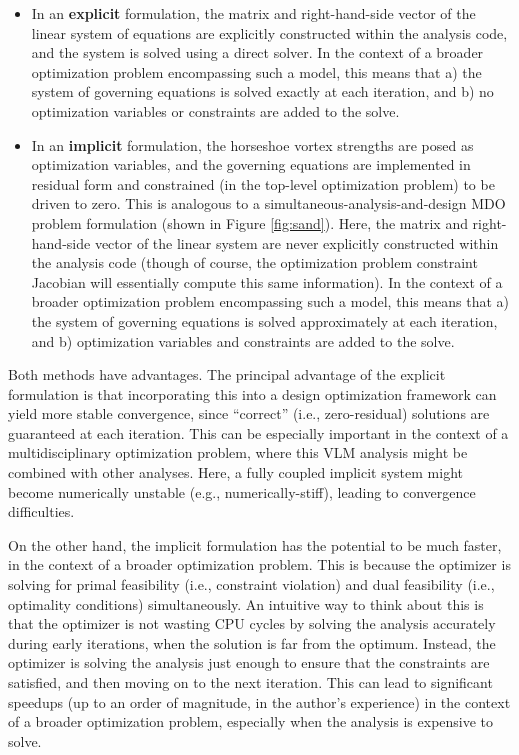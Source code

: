 \begin{itemize}
    \item In an \textbf{explicit} formulation, the matrix and right-hand-side vector of the linear system of equations are explicitly constructed within the analysis code, and the system is solved using a direct solver. In the context of a broader optimization problem encompassing such a model, this means that a) the system of governing equations is solved exactly at each iteration, and b) no optimization variables or constraints are added to the solve.

    \item In an \textbf{implicit} formulation, the horseshoe vortex strengths are posed as optimization variables, and the governing equations are implemented in residual form and constrained (in the top-level optimization problem) to be driven to zero. This is analogous to a simultaneous-analysis-and-design MDO problem formulation (shown in Figure \ref{fig:sand}). Here, the matrix and right-hand-side vector of the linear system are never explicitly constructed within the analysis code (though of course, the optimization problem constraint Jacobian will essentially compute this same information). In the context of a broader optimization problem encompassing such a model, this means that a) the system of governing equations is solved approximately at each iteration, and b) optimization variables and constraints are added to the solve.

\end{itemize}

Both methods have advantages. The principal advantage of the explicit formulation is that incorporating this into a design optimization framework can yield more stable convergence, since ``correct'' (i.e., zero-residual) solutions are guaranteed at each iteration. This can be especially important in the context of a multidisciplinary optimization problem, where this VLM analysis might be combined with other analyses. Here, a fully coupled implicit system might become numerically unstable (e.g., numerically-stiff), leading to convergence difficulties.

On the other hand, the implicit formulation has the potential to be much faster, in the context of a broader optimization problem. This is because the optimizer is solving for primal feasibility (i.e., constraint violation) and dual feasibility (i.e., optimality conditions) simultaneously. An intuitive way to think about this is that the optimizer is not wasting CPU cycles by solving the analysis accurately during early iterations, when the solution is far from the optimum. Instead, the optimizer is solving the analysis just enough to ensure that the constraints are satisfied, and then moving on to the next iteration. This can lead to significant speedups (up to an order of magnitude, in the author's experience) in the context of a broader optimization problem, especially when the analysis is expensive to solve.


